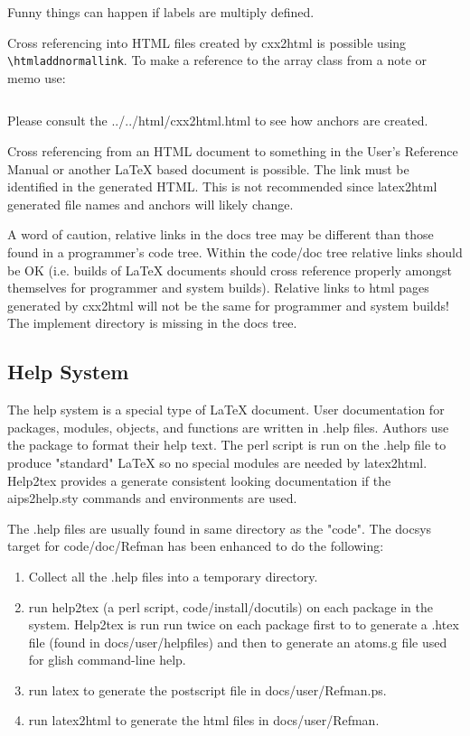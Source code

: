 Funny things can happen if labels are multiply defined.


Cross referencing into HTML files created by cxx2html is possible using
\verb!\htmladdnormallink!.  To make a reference to the array class
from a note or memo use:
\begin{verbatim}
\end{verbatim}

Please consult the 
{../../html/cxx2html.html} to see how anchors are created.

Cross referencing from an HTML document to something in the User's
Reference Manual or another LaTeX based document is possible.
The link must be identified 
in the generated HTML.  This is not recommended since latex2html generated
file names and anchors will likely change.

A word of caution, relative links in the docs tree may be different than those
found in a programmer's code tree.  Within the code/doc tree relative links
should be OK (i.e. builds of LaTeX documents should cross reference properly
amongst themselves for programmer and system builds).  Relative links to html
pages generated by cxx2html will not be the same for programmer and system
builds!  The implement directory is missing in the docs tree.



\subsection{Help System}
The help system is a special type of LaTeX document.  User documentation for
packages, modules, objects, and functions are written in .help files.
Authors use the  package to format their
help text.  The perl script  is run on the
.help file to produce "standard" LaTeX so no special modules are needed by
latex2html.
Help2tex provides a generate consistent looking documentation if the
aips2help.sty commands and environments are used.

The .help files are usually found in same directory as the "code".
The docsys target for code/doc/Refman has been enhanced to do the following:
\begin{enumerate}
\item Collect all the .help files into a temporary directory.
\item run help2tex (a perl script, code/install/docutils) on each package in
the system. Help2tex is run run twice on each package first to to generate
a .htex file (found in docs/user/helpfiles) and then to generate an atoms.g
file used for glish command-line help.
\item run latex to generate the postscript file in docs/user/Refman.ps.
\item run latex2html to generate the html files in docs/user/Refman.
\end{enumerate}


